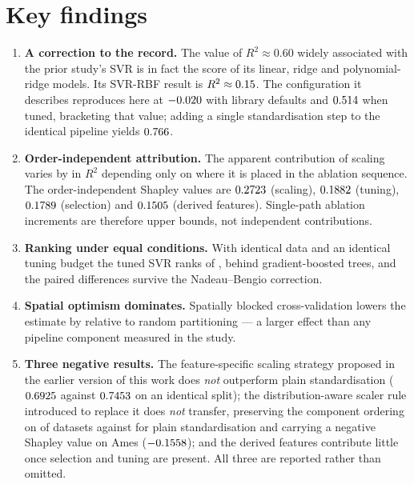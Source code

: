 \documentclass[11pt,a4paper]{article}
\begin{document}
\section{Key findings}
\begin{enumerate}[leftmargin=*,itemsep=3pt]
\item \textbf{A correction to the record.} The value of $R^2 \approx 0.60$ widely associated
      with the prior study's SVR is in fact the score of its linear, ridge and
      polynomial-ridge models. Its SVR-RBF result is $R^2 \approx 0.15$. The
      configuration it describes reproduces here at $-0.020$ with library
      defaults and $0.514$ when tuned, bracketing that value; adding a single
      standardisation step to the identical pipeline yields $0.766$.
\item \textbf{Order-independent attribution.} The apparent contribution of scaling varies by
      \RangeScal{} in $R^2$ depending only on where it is placed in the ablation sequence.
      The order-independent Shapley values are $0.2723$ (scaling), $0.1882$ (tuning),
      $0.1789$ (selection) and $0.1505$ (derived features). Single-path ablation
      increments are therefore upper bounds, not independent contributions.
\item \textbf{Ranking under equal conditions.} With identical data and an identical tuning
      budget the tuned SVR ranks \SvrRankFull{} of \NModels{}, behind gradient-boosted trees,
      and the paired differences survive the Nadeau--Bengio correction.
\item \textbf{Spatial optimism dominates.} Spatially blocked cross-validation lowers the
      estimate by \SpatialOptimism{} relative to random partitioning --- a larger effect than
      any pipeline component measured in the study.
\item \textbf{Three negative results.} The feature-specific scaling strategy proposed in the
      earlier version of this work does \emph{not} outperform plain standardisation
      ($0.6925$ against $0.7453$ on an identical split); the
      distribution-aware scaler rule introduced to replace it does \emph{not} transfer,
      preserving the component ordering on \NOrderHoldsAuto{} of \NDatasets{} datasets
      against \NOrderHoldsUni{} for plain standardisation and carrying a negative Shapley
      value on Ames ($-0.1558$); and the derived features contribute little once
      selection and tuning are present. All three are reported rather than omitted.
\end{enumerate}
\end{document}
